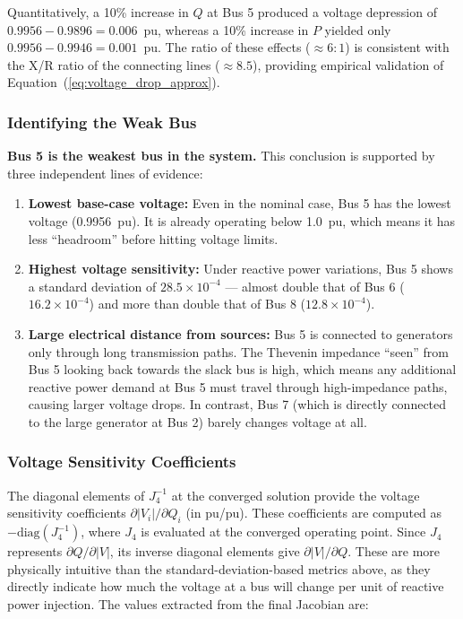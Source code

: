 \documentclass[12pt, a4paper]{article}
\begin{document}
Quantitatively, a 10\% increase in $Q$ at Bus 5 produced a voltage depression of $0.9956 - 0.9896 = 0.006$~pu, whereas a 10\% increase in $P$ yielded only $0.9956 - 0.9946 = 0.001$~pu. The ratio of these effects ($\approx 6:1$) is consistent with the X/R ratio of the connecting lines ($\approx 8.5$), providing empirical validation of Equation~(\ref{eq:voltage_drop_approx}).

\subsubsection{Identifying the Weak Bus}
\textbf{Bus 5 is the weakest bus in the system.} This conclusion is supported by three independent lines of evidence:

\begin{enumerate}
    \item \textbf{Lowest base-case voltage:} Even in the nominal case, Bus 5 has the lowest voltage (0.9956~pu). It is already operating below 1.0~pu, which means it has less ``headroom'' before hitting voltage limits.
    
    \item \textbf{Highest voltage sensitivity:} Under reactive power variations, Bus 5 shows a standard deviation of $28.5 \times 10^{-4}$ --- almost double that of Bus 6 ($16.2 \times 10^{-4}$) and more than double that of Bus 8 ($12.8 \times 10^{-4}$).
    
    \item \textbf{Large electrical distance from sources:} Bus 5 is connected to generators only through long transmission paths. The Thevenin impedance ``seen'' from Bus 5 looking back towards the slack bus is high, which means any additional reactive power demand at Bus 5 must travel through high-impedance paths, causing larger voltage drops. In contrast, Bus 7 (which is directly connected to the large generator at Bus 2) barely changes voltage at all.
\end{enumerate}

\subsubsection{Voltage Sensitivity Coefficients}
The diagonal elements of $J_4^{-1}$ at the converged solution provide the voltage sensitivity coefficients $\partial |V_i| / \partial Q_i$ (in pu/pu). These coefficients are computed as $-\text{diag}(J_4^{-1})$, where $J_4$ is evaluated at the converged operating point. Since $J_4$ represents $\partial Q / \partial |V|$, its inverse diagonal elements give $\partial |V| / \partial Q$. These are more physically intuitive than the standard-deviation-based metrics above, as they directly indicate how much the voltage at a bus will change per unit of reactive power injection. The values extracted from the final Jacobian are:
\end{document}
